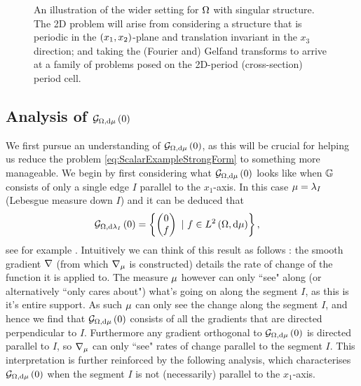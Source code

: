 \begin{figure}[h!]
	\caption{\label{fig:ScalarStrucDiagram} An illustration of the wider setting for $\Omega$ with singular structure. The 2D problem will arise from considering a structure that is periodic in the $\left( x_1,x_2 \right)$-plane and translation invariant in the $x_3$ direction; and taking the (Fourier and) Gelfand transforms to arrive at a family of problems posed on the 2D-period (cross-section) period cell. }
\end{figure}

\subsection{Analysis of $\mathcal{G}_{ \Omega, \mathrm{d}\mu}\left( 0 \right)$}
We first pursue an understanding of $\mathcal{G}_{ \Omega, \mathrm{d}\mu}\left( 0 \right)$, as this will be crucial for helping us reduce the problem \eqref{eq:ScalarExampleStrongForm} to something more manageable.
We begin by first considering what $\mathcal{G}_{ \Omega, \mathrm{d}\mu}\left( 0 \right)$ looks like when $\mathbb{G}$ consists of only a single edge $I$ parallel to the $x_1$-axis.
In this case $\mu = \lambda_I$ (Lebesgue measure down $I$) and it can be deduced that 
\begin{align*}
	\mathcal{G}_{ \Omega, \mathrm{d}\lambda_I}\left( 0 \right) &= 
	\left\{ 
		\begin{pmatrix} 0 \\ f	\end{pmatrix}
		\ \vert \ f\in L^{2}\left( \Omega,\mathrm{d}\mu \right)
	 \right\},
\end{align*}
see for example \cite{zhikov2000extension}.
Intuitively we can think of this result as follows : the smooth gradient $\nabla$ (from which $\nabla_\mu$ is constructed) details the rate of change of the function it is applied to.
The measure $\mu$ however can only ``see" along (or alternatively ``only cares about") what's going on along the segment $I$, as this is it's entire support.
As such $\mu$ can only see the change along the segment $I$, and hence we find that $\mathcal{G}_{ \Omega, \mathrm{d}\mu}\left( 0 \right)$ consists of all the gradients that are directed perpendicular to $I$.
Furthermore any gradient orthogonal to $\mathcal{G}_{ \Omega, \mathrm{d}\mu}\left( 0 \right)$ is directed parallel to $I$, so $\nabla_\mu$ can only ``see" rates of change parallel to the segment $I$.
This interpretation is further reinforced by the following analysis, which characterises $\mathcal{G}_{ \Omega, \mathrm{d}\mu}\left( 0 \right)$ when the segment $I$ is not (necessarily) parallel to the $x_1$-axis. \newline

